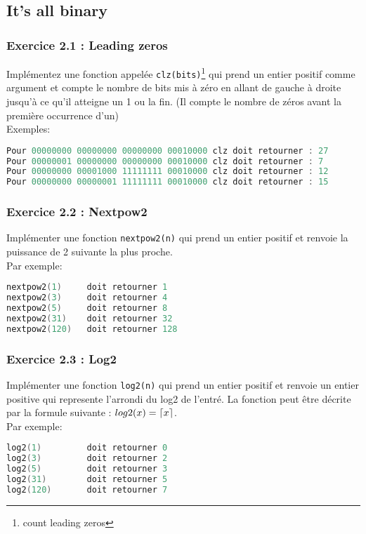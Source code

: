 \documentclass[a4paper]{article}
\DeclarePairedDelimiter\ceil{\lceil}{\rceil}
\begin{document}
	\subsection*{It's all binary}
	\subsubsection*{Exercice 2.1 : Leading zeros}
	Implémentez une fonction appelée \texttt{clz(bits)}\footnote{count leading zeros} qui prend un entier positif comme argument et compte le nombre de bits mis à zéro en allant de gauche à droite jusqu'à ce qu'il atteigne un 1 ou la fin. (Il compte le nombre de zéros avant la première occurrence d'un) \\
	Exemples:
\begin{lstlisting}[language=C]
Pour 00000000 00000000 00000000 00010000 clz doit retourner : 27
Pour 00000001 00000000 00000000 00010000 clz doit retourner : 7
Pour 00000000 00001000 11111111 00010000 clz doit retourner : 12
Pour 00000000 00000001 11111111 00010000 clz doit retourner : 15
\end{lstlisting}

	
	\subsubsection*{Exercice 2.2 : Nextpow2}
	Implémenter une fonction \texttt{nextpow2(n)} qui prend un entier positif et renvoie la puissance de 2 suivante la plus proche. \\
	Par exemple:
\begin{lstlisting}[language=C]
nextpow2(1) 	doit retourner 1
nextpow2(3) 	doit retourner 4
nextpow2(5) 	doit retourner 8
nextpow2(31) 	doit retourner 32
nextpow2(120) 	doit retourner 128
\end{lstlisting}

	\subsubsection*{Exercice 2.3 : Log2}
	Implémenter une fonction \texttt{log2(n)} qui prend un entier positif et renvoie un entier positive qui represente l'arrondi du log2 de l'entré.  La fonction peut être décrite par la formule suivante : $log2(x) = \ceil*{x}$. \\
	Par exemple:
	\begin{lstlisting}[language=C]
log2(1) 		doit retourner 0
log2(3) 		doit retourner 2
log2(5) 		doit retourner 3
log2(31) 		doit retourner 5
log2(120) 		doit retourner 7
	\end{lstlisting}
\end{document}
